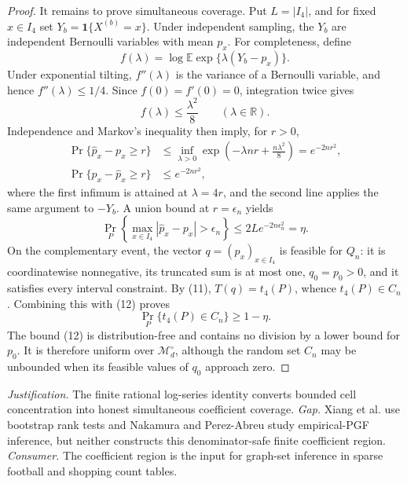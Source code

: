 \documentclass{article}
\begin{document}
\begin{proof}
It remains to prove simultaneous coverage.  Put \(L=|I_4|\), and for fixed \(x\in I_4\) set \(Y_b=\mathbf 1\{X^{(b)}=x\}\).  Under independent sampling, the \(Y_b\) are independent Bernoulli variables with mean \(p_x\).  For completeness, define
\[
 f(\lambda)=\log\mathbb E\exp\{\lambda(Y_b-p_x)\}.
\]
Under exponential tilting, \(f''(\lambda)\) is the variance of a Bernoulli variable, and hence \(f''(\lambda)\le1/4\).  Since \(f(0)=f'(0)=0\), integration twice gives
\[
 f(\lambda)\le\frac{\lambda^2}{8}\qquad(\lambda\in\mathbb R).
\]
Independence and Markov's inequality then imply, for \(r>0\),
\[
\begin{aligned}
 \Pr\{\widehat p_x-p_x\ge r\}
 &\le\inf_{\lambda>0}
   \exp\left(-\lambda nr+\frac{n\lambda^2}{8}\right)
 =e^{-2nr^2},\\
 \Pr\{p_x-\widehat p_x\ge r\}&\le e^{-2nr^2},
\end{aligned}
\]
where the first infimum is attained at \(\lambda=4r\), and the second line applies the same argument to \(-Y_b\).  A union bound at \(r=\epsilon_n\) yields
\[
 \Pr_P\!\left\{
   \max_{x\in I_4}|\widehat p_x-p_x|>\epsilon_n
 \right\}
 \le 2L e^{-2n\epsilon_n^2}=\eta.
\tag{12}
\]
On the complementary event, the vector \(q=(p_x)_{x\in I_4}\) is feasible for \(Q_n\): it is coordinatewise nonnegative, its truncated sum is at most one, \(q_0=p_0>0\), and it satisfies every interval constraint.  By (11), \(T(q)=t_4(P)\), whence \(t_4(P)\in C_n\).  Combining this with (12) proves
\[
 \Pr_P\{t_4(P)\in C_n\}\ge1-\eta.
\]
The bound (12) is distribution-free and contains no division by a lower bound for \(p_0\).  It is therefore uniform over \(\mathcal M_d^\circ\), although the random set \(C_n\) may be unbounded when its feasible values of \(q_0\) approach zero.
\end{proof}
\par\smallskip\noindent \textit{Justification.} The finite rational log-series identity converts bounded cell concentration into honest simultaneous coefficient coverage. \textit{Gap.} Xiang et al. use bootstrap rank tests and Nakamura and Perez-Abreu study empirical-PGF inference, but neither constructs this denominator-safe finite coefficient region. \textit{Consumer.} The coefficient region is the input for graph-set inference in sparse football and shopping count tables.
\end{document}
